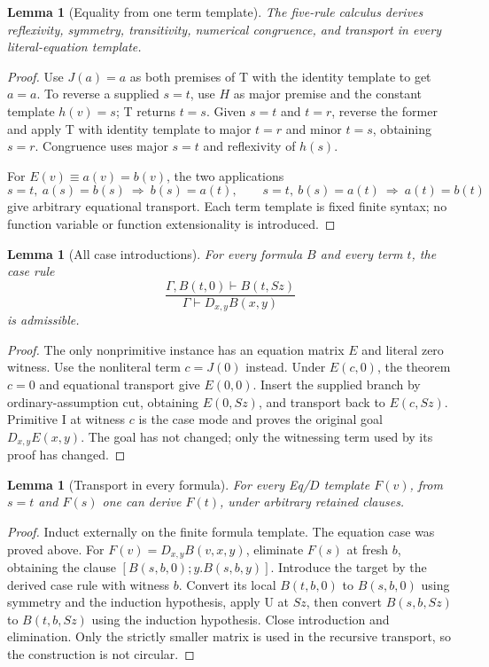 \documentclass[11pt,letterpaper]{article}
\newtheorem{lemma}[theorem]{Lemma}
\theoremstyle{definition}\newtheorem{definition}[theorem]{Definition}
\begin{document}
\begin{lemma}[Equality from one term template]
The five-rule calculus derives reflexivity, symmetry, transitivity,
numerical congruence, and transport in every literal-equation template.
\end{lemma}
\begin{proof}
Use $J(a)=a$ as both premises of T with the identity template to get
$a=a$. To reverse a supplied $s=t$, use $H$ as major premise and the
constant template $h(v)=s$; T returns $t=s$. Given $s=t$ and $t=r$,
reverse the former and apply T with identity template to major $t=r$
and minor $t=s$, obtaining $s=r$. Congruence uses major $s=t$ and
reflexivity of $h(s)$.

For $E(v)\equiv a(v)=b(v)$, the two applications
\[
 s=t,\ a(s)=b(s)\ \Longrightarrow\ b(s)=a(t),
 \qquad
 s=t,\ b(s)=a(t)\ \Longrightarrow\ a(t)=b(t)
\]
give arbitrary equational transport. Each term template is fixed finite
syntax; no function variable or function extensionality is introduced.
\end{proof}

\begin{lemma}[All case introductions]
For every formula $B$ and every term $t$, the case rule
\[
 \frac{\Gamma,B(t,0)\vdash B(t,Sz)}
      {\Gamma\vdash D_{x,y}B(x,y)}
\]
is admissible.
\end{lemma}
\begin{proof}
The only nonprimitive instance has an equation matrix $E$ and literal
zero witness. Use the nonliteral term $c=J(0)$ instead. Under $E(c,0)$,
the theorem $c=0$ and equational transport give $E(0,0)$. Insert the
supplied branch by ordinary-assumption cut, obtaining $E(0,Sz)$, and
transport back to $E(c,Sz)$. Primitive I at witness $c$ is the case mode
and proves the original goal $D_{x,y}E(x,y)$. The goal has not changed;
only the witnessing term used by its proof has changed.
\end{proof}

\begin{lemma}[Transport in every formula]
For every Eq/$D$ template $F(v)$, from $s=t$ and $F(s)$ one can derive
$F(t)$, under arbitrary retained clauses.
\end{lemma}
\begin{proof}
Induct externally on the finite formula template. The equation case was
proved above. For $F(v)=D_{x,y}B(v,x,y)$, eliminate $F(s)$ at fresh $b$,
obtaining the clause $[B(s,b,0);y.B(s,b,y)]$. Introduce the target by the
derived case rule with witness $b$. Convert its local $B(t,b,0)$ to
$B(s,b,0)$ using symmetry and the induction hypothesis, apply U at $Sz$,
then convert $B(s,b,Sz)$ to $B(t,b,Sz)$ using the induction hypothesis.
Close introduction and elimination. Only the strictly smaller matrix is
used in the recursive transport, so the construction is not circular.
\end{proof}
\end{document}

